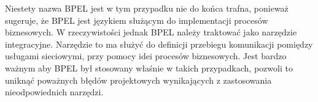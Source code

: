 Niestety nazwa BPEL jest w tym przypadku nie do końca trafna, ponieważ sugeruje, że BPEL jest językiem służącym do implementacji procesów biznesowych. W rzeczywistości jednak BPEL należy traktować jako narzędzie integracyjne. Narzędzie to ma służyć do definicji przebiegu komunikacji pomiędzy usługami sieciowymi, przy pomocy idei procesów biznesowych. Jest bardzo ważnym aby BPEL był stosowany właśnie w takich przypadkach, pozwoli to uniknąć poważnych błędów projektowych wynikających z zastosowania nieodpowiednich narzędzi.  